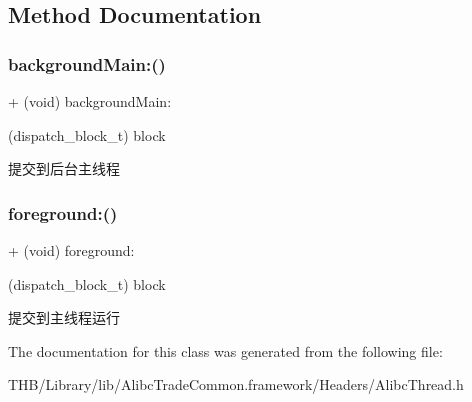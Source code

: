 \subsection{Method Documentation}
\mbox{\label{interface_alibc_thread_a31cdc4f99c101ead27c630f16f5d53ad}} 
\subsubsection{\texorpdfstring{background\+Main\+:()}{backgroundMain:()}}
{\footnotesize\ttfamily + (void) background\+Main\+: \begin{DoxyParamCaption}\item[{(dispatch\+\_\+block\+\_\+t)}]{block }\end{DoxyParamCaption}}

提交到后台主线程 \mbox{\label{interface_alibc_thread_a6bdedce29f56318776821b9eaa2c3dc9}} 
\subsubsection{\texorpdfstring{foreground\+:()}{foreground:()}}
{\footnotesize\ttfamily + (void) foreground\+: \begin{DoxyParamCaption}\item[{(dispatch\+\_\+block\+\_\+t)}]{block }\end{DoxyParamCaption}}

提交到主线程运行 

The documentation for this class was generated from the following file\+:\begin{DoxyCompactItemize}
\item 
T\+H\+B/\+Library/lib/\+Alibc\+Trade\+Common.\+framework/\+Headers/Alibc\+Thread.\+h\end{DoxyCompactItemize}
